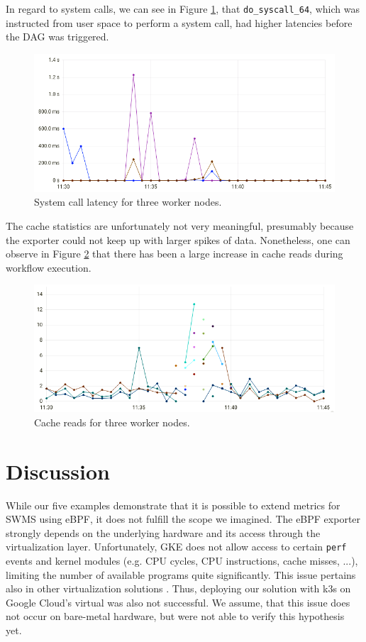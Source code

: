\documentclass[a4paper,journal]{IEEEtran}
\begin{document}
In regard to system calls, we can see in Figure \ref{fig:results:syscalls}, that \texttt{do\_syscall\_64}, which was instructed from user space to perform a system call, had higher latencies before the DAG was triggered.
\begin{figure}[h]
	\includegraphics[width=\linewidth]{images/results_syscalls_total.png}
	\caption{System call latency for three worker nodes.}
	\label{fig:results:syscalls}
\end{figure}

The cache statistics are unfortunately not very meaningful, presumably because the exporter could not keep up with larger spikes of data. Nonetheless, one can observe in Figure \ref{fig:results:cachestat} that there has been a large increase in cache reads during workflow execution.
\begin{figure}[h]
	\includegraphics[width=\linewidth]{images/results_cachestat_access.png}
	\caption{Cache reads for three worker nodes.}
	\label{fig:results:cachestat}
\end{figure}

\section{Discussion}
\label{sec:discussion}
While our five examples demonstrate that it is possible to extend metrics for SWMS using eBPF, it does not fulfill the scope we imagined.
The eBPF exporter strongly depends on the underlying hardware and its access through the virtualization layer. Unfortunately, GKE does not allow access to certain \texttt{perf} events and kernel modules (e.g. CPU cycles, CPU instructions, cache misses, ...), limiting the number of available programs quite significantly. This issue pertains also in other virtualization solutions \cite{ebpfVirtIssue1}\cite{ebpfVirtIssue2}\cite{ebpfVirtIssue3}. Thus, deploying our solution with k3s on Google Cloud's virtual was also not successful. We assume, that this issue does not occur on bare-metal hardware, but were not able to verify this hypothesis yet.
\end{document}
